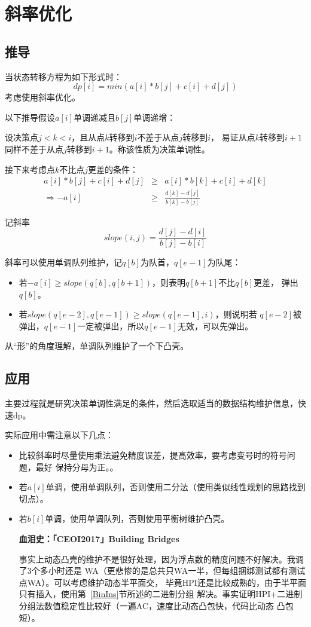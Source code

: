 \section{斜率优化}\label{Slope}
\subsection{推导}
当状态转移方程为如下形式时：
\begin{displaymath}
    dp[i]=min(a[i]*b[j]+c[i]+d[j])
\end{displaymath}
考虑使用斜率优化。

以下推导假设$a[i]$单调递减且$b[j]$单调递增：

设决策点$j<k<i$，且从点$k$转移到$i$不差于从点$j$转移到$i$，
易证从点$k$转移到$i+1$同样不差于从点$j$转移到$i+1$。称该性质为决策单调性。

接下来考虑点$k$不比点$j$更差的条件：
\begin{eqnarray*}
    a[i]*b[j]+c[i]+d[j]&\geq&a[i]*b[k]+c[i]+d[k]\\
    \Rightarrow -a[i]&\geq&\frac{d[k]-d[j]}{b[k]-b[j]}
\end{eqnarray*}

记斜率
\begin{displaymath}
    slope(i,j)=\frac{d[j]-d[i]}{b[j]-b[i]}
\end{displaymath}

斜率可以使用单调队列维护，记$q[b]$为队首，$q[e-1]$为队尾：
\begin{itemize}
    \item 若$-a[i]\geq slope(q[b],q[b+1])$，则表明$q[b+1]$不比$q[b]$更差，
    弹出$q[b]$。
    \item 若$slope(q[e-2],q[e-1])\geq slope(q[e-1],i)$，则说明若
    $q[e-2]$被弹出，$q[e-1]$一定被弹出，所以$q[e-1]$无效，可以先弹出。
\end{itemize}

从``形''的角度理解，单调队列维护了一个下凸壳。
\subsection{应用}
主要过程就是研究决策单调性满足的条件，然后选取适当的数据结构维护信息，快速dp。

实际应用中需注意以下几点：
\begin{itemize}
    \item 比较斜率时尽量使用乘法避免精度误差，提高效率，要考虑变号时的符号问题，最好
    保持分母为正。。
    \item 若$a[i]$单调，使用单调队列，否则使用二分法（使用类似线性规划的思路找到切点）。
    \item 若$b[i]$单调，使用单调队列，否则使用平衡树维护凸壳。

    {\bfseries 血泪史：「CEOI2017」Building Bridges

    事实上动态凸壳的维护不是很好处理，因为浮点数的精度问题不好解决。我调了3个多小时还是
    WA（更悲惨的是总共只WA一半，但每组捆绑测试都有测试点WA）。可以考虑维护动态半平面交，
    毕竟HPI还是比较成熟的，由于半平面只有插入，使用第~\ref{BinIns}节所述的二进制分组
    解决。事实证明HPI+二进制分组法数值稳定性比较好（一遍AC，速度比动态凸包快，代码比动态
    凸包短）。
    }
\end{itemize}


